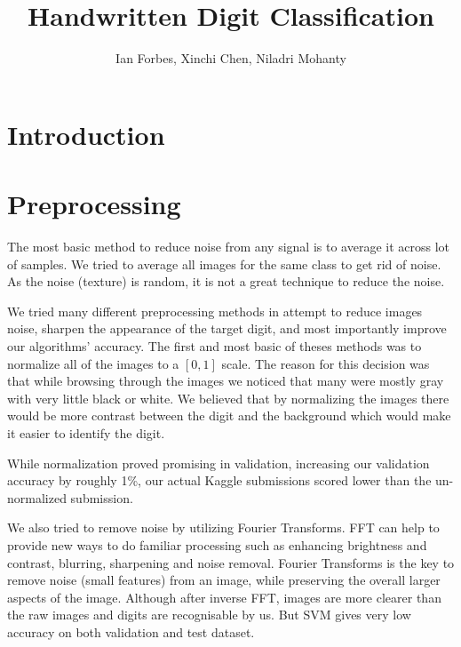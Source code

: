 \documentclass[10pt,twocolumn]{article}
\title{Handwritten Digit Classification}
\author{Ian Forbes, Xinchi Chen, Niladri Mohanty}
\begin{document}
\section{Introduction}
\section{Preprocessing}
The most basic method to reduce noise from any signal is to average it across lot of samples.  We tried to average all images for the same class to get rid of noise. As the noise (texture) is random, it is not a great technique to reduce the noise.

We tried many different preprocessing methods in attempt to reduce images noise, sharpen the appearance of the target digit, and most importantly improve our algorithms' accuracy. The first and most basic of theses methods was to normalize all of the images to a $[0,1]$ scale. The reason for this decision was that while browsing through the images we noticed that many were mostly gray with very little black or white. We believed that by normalizing the images there would be more contrast between the digit and the background which would make it easier to identify the digit.

While normalization proved promising in validation, increasing our validation accuracy by roughly 1\%, our actual Kaggle submissions scored lower than the un-normalized submission.

We also tried to remove noise by utilizing Fourier Transforms. FFT can help to provide new ways to do familiar processing such as enhancing brightness and contrast, blurring, sharpening and noise removal. Fourier Transforms is the key to remove noise (small features) from an image, while preserving the overall larger aspects of the image. Although after inverse FFT, images are more clearer than the raw images and digits are recognisable by us. But SVM gives very low accuracy on both validation and test dataset.
\end{document}

